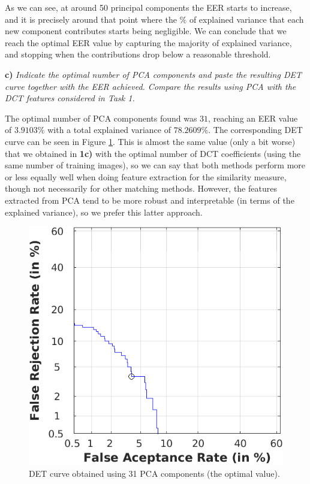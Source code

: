 \documentclass[11pt]{article}
\begin{document}
As we can see, at around 50 principal components the EER starts to increase, and it is precisely around that point where the $\%$ of explained variance that each new component contributes starts being negligible. We can conclude that we reach the optimal EER value by capturing the majority of explained variance, and stopping when the contributions drop below a reasonable threshold.

\textbf{c)} \textit{Indicate the optimal number of PCA components and paste the resulting DET curve together with the EER achieved. Compare the results using PCA with the DCT features considered in Task 1.}

The optimal number of PCA components found was $31$, reaching an EER value of $3.9103\%$ with a total explained variance of $78.2609\%$. The corresponding DET curve can be seen in Figure \ref{fig:ex2c}. This is almost the same value (only a bit worse) that we obtained in \textbf{1c)} with the optimal number of DCT coefficients (using the same number of training images), so we can say that both methods perform more or less equally well when doing feature extraction for the similarity measure, though not necessarily for other matching methods. However, the features extracted from PCA tend to be more robust and interpretable (in terms of the explained variance), so we prefer this latter approach.

\begin{figure}[h!]
  \centering
    \includegraphics[scale=0.8]{img/2c_det}
    \caption{DET curve obtained using 31 PCA components (the optimal value).}
    \label{fig:ex2c}
\end{figure}
\end{document}

